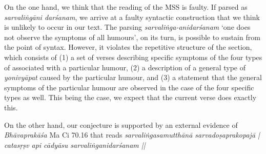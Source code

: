 On the one hand, we think that the reading of the MSS is faulty. If parsed as \textit{sarvaliṅgāni darśanam}, we arrive at a faulty syntactic construction that we think is unlikely to occur in our text. The parsing \textit{sarvaliṅga-anidarśanam} ‘one does not observe the symptoms of all humours’, on its turn, is possible to sustain from the point of syntax. However, it violates the repetitive structure of the section, which consists of (1) a set of verses describing specific symptoms of the four types of  associated with a particular humour, (2) a description of a general type of \textit{yonivyāpat}{} caused by the particular humour, and (3) a statement that the general symptoms of the particular humour are observed in the case of the four specific types as well. This being the case, we expect that the current verse does exactly this.

On the other hand, our conjecture is supported by an external evidence of \textit{Bhāvaprakāśa} Ma Ci 70.16 that reads \textit{sarvaliṅgasamutthānā sarvadoṣaprakopajā | catasṛṣv api cādyāsu sarvaliṅganidarśanam ||} 


